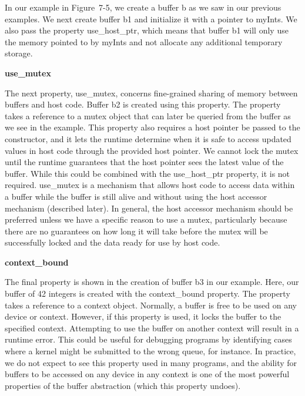 In our example in Figure 7-5, we create a buffer b as we saw in our previous examples. We next create buffer b1 and initialize it with a pointer to myInts. We also pass the property use\_host\_ptr, which means that buffer b1 will only use the memory pointed to by myInts and not allocate any additional temporary storage.\par

\hspace*{\fill} \par %
\textbf{use\_mutex}

The next property, use\_mutex, concerns fine-grained sharing of memory between buffers and host code. Buffer b2 is created using this property. The property takes a reference to a mutex object that can later be queried from the buffer as we see in the example. This property also requires a host pointer be passed to the constructor, and it lets the runtime determine when it is safe to access updated values in host code through the provided host pointer. We cannot lock the mutex until the runtime guarantees that the host pointer sees the latest value of the buffer. While this could be combined with the use\_host\_ptr property, it is not required. use\_mutex is a mechanism that allows host code to access data within a buffer while the buffer is still alive and without using the host accessor mechanism (described later). In general, the host accessor mechanism should be preferred unless we have a specific reason to use a mutex, particularly because there are no guarantees on how long it will take before the mutex will be successfully locked and the data ready for use by host code.\par

\hspace*{\fill} \par %
\textbf{context\_bound}

The final property is shown in the creation of buffer b3 in our example. Here, our buffer of 42 integers is created with the context\_bound property. The property takes a reference to a context object. Normally, a buffer is free to be used on any device or context. However, if this property is used, it locks the buffer to the specified context. Attempting to use the buffer on another context will result in a runtime error. This could be useful for debugging programs by identifying cases where a kernel might be submitted to the wrong queue, for instance. In practice, we do not expect to see this property used in many programs, and the ability for buffers to be accessed on any device in any context is one of the most powerful properties of the buffer abstraction (which this property undoes).\par

